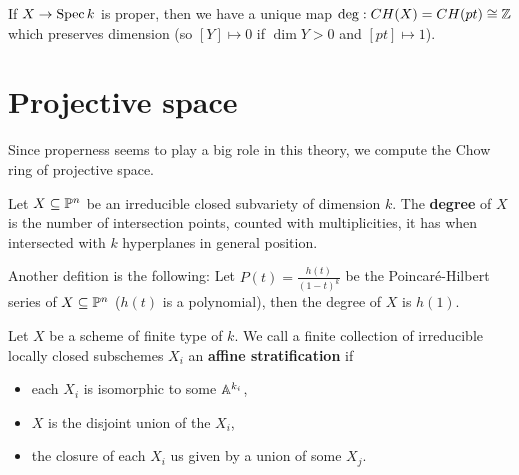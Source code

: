 \begin{proposition}
If $X\to \operatorname{Spec} k$ is proper, then we have a unique map $\deg:CH(X)=CH(pt)\cong \mathbb{Z}$ which preserves dimension (so $[Y]\mapsto 0$ if $\dim Y>0$ and $[pt]\mapsto 1$).
\end{proposition}



\section{Projective space}
Since properness seems to play a big role in this theory, we compute the Chow ring of projective space.

\begin{definition}[]
Let $X\subseteq \mathbb{P}^n$ be an irreducible closed subvariety of dimension $k$. The \textbf{degree} of $X$ is the number of intersection points, counted with multiplicities, it has when intersected with $k$ hyperplanes in general position.

Another defition is the following: Let $P(t)=\frac{h(t)}{(1-t)^k}$ be the Poincar\'e-Hilbert series of $X\subseteq \mathbb{P}^n$ ($h(t)$ is a polynomial), then the degree of $X$ is $h(1)$.
\end{definition}

\begin{definition}[]
Let $X$ be a scheme of finite type of $k$. We call a finite collection of irreducible locally closed subschemes $X_i$ an \textbf{affine stratification} if 
\begin{itemize}
\item each $X_i$ is isomorphic to some $\mathbb{A}^{k_i}$,
\item $X$ is the disjoint union of the $X_i$,
\item the closure of each $X_i$ us given by a union of some $X_j$.
\end{itemize}
\end{definition}

